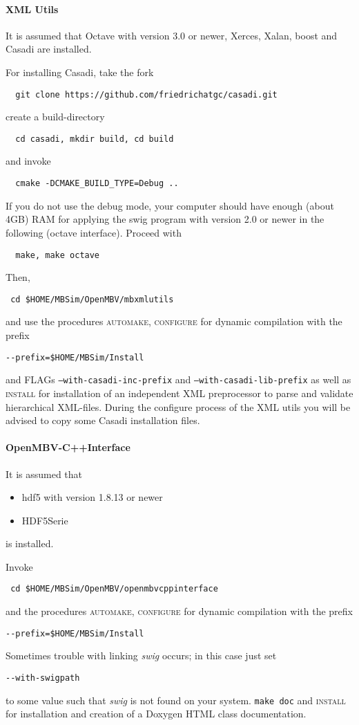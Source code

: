 \paragraph{XML Utils}
It is assumed that Octave with version 3.0 or newer, Xerces, Xalan, boost and Casadi are installed.\par
For installing Casadi, take the fork
\begin{verbatim}
  git clone https://github.com/friedrichatgc/casadi.git
\end{verbatim}
create a build-directory
\begin{verbatim}
  cd casadi, mkdir build, cd build
\end{verbatim}
and invoke
\begin{verbatim}
  cmake -DCMAKE_BUILD_TYPE=Debug ..
\end{verbatim}
If you do not use the debug mode, your computer should have enough (about 4GB) RAM for applying the swig program with version 2.0 or newer in the following (octave interface). Proceed with
\begin{verbatim}
  make, make octave
\end{verbatim}
Then,
\begin{verbatim}
 cd $HOME/MBSim/OpenMBV/mbxmlutils
\end{verbatim} 
and use the procedures \textsc{automake}, \textsc{configure} for dynamic compilation with the prefix
\begin{verbatim}
--prefix=$HOME/MBSim/Install
\end{verbatim}
and FLAGs \texttt{--with-casadi-inc-prefix} and \texttt{--with-casadi-lib-prefix} as well as \textsc{install} for installation of an independent XML preprocessor to parse and validate hierarchical XML-files. During the configure process of the XML utils you will be advised to copy some Casadi installation files.

\paragraph{OpenMBV-C++Interface}
It is assumed that 
\begin{itemize}
\item hdf5 with version 1.8.13 or newer
\item HDF5Serie 
\end{itemize}
is installed.\par
Invoke
\begin{verbatim}
 cd $HOME/MBSim/OpenMBV/openmbvcppinterface
\end{verbatim} 
and the procedures \textsc{automake, configure} for dynamic compilation with the prefix
\begin{verbatim}
--prefix=$HOME/MBSim/Install
\end{verbatim}
Sometimes trouble with linking \emph{swig} occurs; in this case just set
\begin{verbatim}
--with-swigpath
\end{verbatim}
to some value such that \emph{swig} is not found on your system.
\texttt{make doc} and \textsc{install} for installation and creation of a Doxygen HTML class documentation. 

